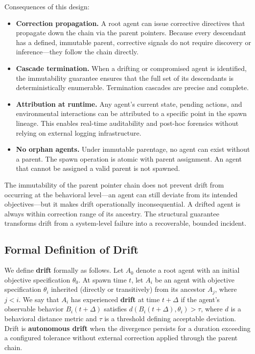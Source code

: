 Consequences of this design:

\begin{itemize}
    \item \textbf{Correction propagation.} A root agent can issue corrective directives that propagate down the chain via the parent pointers. Because every descendant has a defined, immutable parent, corrective signals do not require discovery or inference—they follow the chain directly.
    \item \textbf{Cascade termination.} When a drifting or compromised agent is identified, the immutability guarantee ensures that the full set of its descendants is deterministically enumerable. Termination cascades are precise and complete.
    \item \textbf{Attribution at runtime.} Any agent's current state, pending actions, and environmental interactions can be attributed to a specific point in the spawn lineage. This enables real-time auditability and post-hoc forensics without relying on external logging infrastructure.
    \item \textbf{No orphan agents.} Under immutable parentage, no agent can exist without a parent. The spawn operation is atomic with parent assignment. An agent that cannot be assigned a valid parent is not spawned.
\end{itemize}

The immutability of the parent pointer chain does not prevent drift from occurring at the behavioral level—an agent can still deviate from its intended objectives—but it makes drift operationally inconsequential. A drifted agent is always within correction range of its ancestry. The structural guarantee transforms drift from a system-level failure into a recoverable, bounded incident.

\subsection{Formal Definition of Drift}

We define \textbf{drift} formally as follows. Let $A_0$ denote a root agent with an initial objective specification $\theta_0$. At spawn time $t$, let $A_i$ be an agent with objective specification $\theta_i$ inherited (directly or transitively) from its ancestor $A_j$, where $j < i$. We say that $A_i$ has experienced \textbf{drift} at time $t + \Delta$ if the agent's observable behavior $B_i(t + \Delta)$ satisfies $d(B_i(t + \Delta), \theta_i) > \tau$, where $d$ is a behavioral distance metric and $\tau$ is a threshold defining acceptable deviation. Drift is \textbf{autonomous drift} when the divergence persists for a duration exceeding a configured tolerance without external correction applied through the parent chain.

